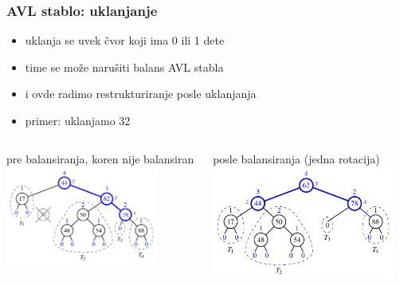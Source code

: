 \documentclass[compress]{beamer}
\begin{document}
\begin{frame}[fragile]
  \frametitle{AVL stablo: uklanjanje}
  \begin{itemize}
    \item uklanja se uvek čvor koji ima 0 ili 1 dete
    \item time se može narušiti balans AVL stabla
    \item i ovde radimo restrukturiranje posle uklanjanja
    \item primer: uklanjamo 32
  \end{itemize}
  \begin{columns}
    \begin{column}[t]{6cm}
      \begin{center}
        pre balansiranja, koren nije balansiran 
        \includegraphics[width=5cm]{asp-11-pic17a.pdf}
      \end{center}
    \end{column}  
    \begin{column}[t]{6cm}
      \begin{center}
        posle balansiranja (jedna rotacija)
        \includegraphics[width=6cm]{asp-11-pic17b.pdf}
      \end{center}
    \end{column}  
  \end{columns}
\end{frame}
\end{document}

